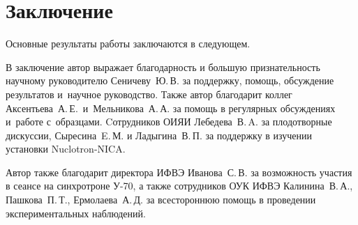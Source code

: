 \chapter*{Заключение}                       %


Основные результаты работы заключаются в следующем.


В заключение автор
выражает благодарность и большую признательность научному руководителю
Сеничеву~Ю.\,В. за поддержку, помощь, обсуждение результатов и~научное
руководство. 
Также автор благодарит коллег Аксентьева~А.\,Е.~и~Мельникова~А.\,А.
за помощь в регулярных обсуждениях и~работе с~образцами. Cотрудников ОИЯИ Лебедева~В.\,A. за плодотворные дискуссии, Сыресина~E.\,М. и Ладыгина~В.\,П. за поддержку в изучении установки Nuclotron-NICA.

Автор также благодарит директора ИФВЭ Иванова~С.\,В. за возможность участия в сеансе на синхротроне У-70, а также сотрудников ОУК ИФВЭ Калинина~В.\,А., Пашкова~П.\,Т., Ермолаева~А.\,Д. за всестороннюю помощь в проведении экспериментальных наблюдений. 